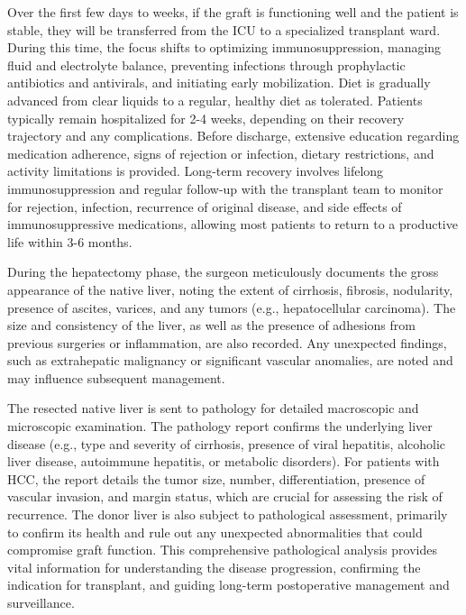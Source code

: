 Over the first few days to weeks, if the graft is functioning well and the patient is stable, they will be transferred from the ICU to a specialized transplant ward. During this time, the focus shifts to optimizing immunosuppression, managing fluid and electrolyte balance, preventing infections through prophylactic antibiotics and antivirals, and initiating early mobilization. Diet is gradually advanced from clear liquids to a regular, healthy diet as tolerated. Patients typically remain hospitalized for 2-4 weeks, depending on their recovery trajectory and any complications. Before discharge, extensive education regarding medication adherence, signs of rejection or infection, dietary restrictions, and activity limitations is provided. Long-term recovery involves lifelong immunosuppression and regular follow-up with the transplant team to monitor for rejection, infection, recurrence of original disease, and side effects of immunosuppressive medications, allowing most patients to return to a productive life within 3-6 months.

During the hepatectomy phase, the surgeon meticulously documents the gross appearance of the native liver, noting the extent of cirrhosis, fibrosis, nodularity, presence of ascites, varices, and any tumors (e.g., hepatocellular carcinoma). The size and consistency of the liver, as well as the presence of adhesions from previous surgeries or inflammation, are also recorded. Any unexpected findings, such as extrahepatic malignancy or significant vascular anomalies, are noted and may influence subsequent management.

The resected native liver is sent to pathology for detailed macroscopic and microscopic examination. The pathology report confirms the underlying liver disease (e.g., type and severity of cirrhosis, presence of viral hepatitis, alcoholic liver disease, autoimmune hepatitis, or metabolic disorders). For patients with HCC, the report details the tumor size, number, differentiation, presence of vascular invasion, and margin status, which are crucial for assessing the risk of recurrence. The donor liver is also subject to pathological assessment, primarily to confirm its health and rule out any unexpected abnormalities that could compromise graft function. This comprehensive pathological analysis provides vital information for understanding the disease progression, confirming the indication for transplant, and guiding long-term postoperative management and surveillance.

